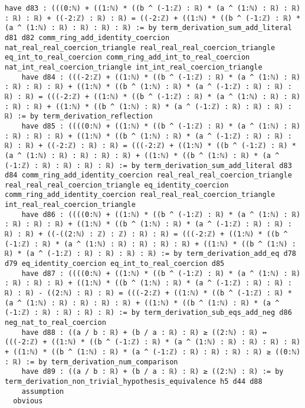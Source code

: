 \documentclass{article}
\begin{document}
\begin{tcolorbox}[colback=white!10, width=\linewidth]
\begin{lstlisting}[language=Lean4]
    have d83 : (((0:ℕ) + ((1:ℕ) * ((b ^ (-1:ℤ) : ℝ) * (a ^ (1:ℕ) : ℝ) : ℝ) : ℝ) : ℝ) + ((-2:ℤ) : ℝ) : ℝ) = ((-2:ℤ) + ((1:ℕ) * ((b ^ (-1:ℤ) : ℝ) * (a ^ (1:ℕ) : ℝ) : ℝ) : ℝ) : ℝ) := by term_derivation_sum_add_literal d81 d82 comm_ring_add_identity_coercion nat_real_real_coercion_triangle real_real_real_coercion_triangle eq_int_to_real_coercion comm_ring_add_int_to_real_coercion nat_int_real_coercion_triangle int_int_real_coercion_triangle
    have d84 : (((-2:ℤ) + ((1:ℕ) * ((b ^ (-1:ℤ) : ℝ) * (a ^ (1:ℕ) : ℝ) : ℝ) : ℝ) : ℝ) + ((1:ℕ) * ((b ^ (1:ℕ) : ℝ) * (a ^ (-1:ℤ) : ℝ) : ℝ) : ℝ) : ℝ) = (((-2:ℤ) + ((1:ℕ) * ((b ^ (-1:ℤ) : ℝ) * (a ^ (1:ℕ) : ℝ) : ℝ) : ℝ) : ℝ) + ((1:ℕ) * ((b ^ (1:ℕ) : ℝ) * (a ^ (-1:ℤ) : ℝ) : ℝ) : ℝ) : ℝ) := by term_derivation_reflection
    have d85 : ((((0:ℕ) + ((1:ℕ) * ((b ^ (-1:ℤ) : ℝ) * (a ^ (1:ℕ) : ℝ) : ℝ) : ℝ) : ℝ) + ((1:ℕ) * ((b ^ (1:ℕ) : ℝ) * (a ^ (-1:ℤ) : ℝ) : ℝ) : ℝ) : ℝ) + ((-2:ℤ) : ℝ) : ℝ) = (((-2:ℤ) + ((1:ℕ) * ((b ^ (-1:ℤ) : ℝ) * (a ^ (1:ℕ) : ℝ) : ℝ) : ℝ) : ℝ) + ((1:ℕ) * ((b ^ (1:ℕ) : ℝ) * (a ^ (-1:ℤ) : ℝ) : ℝ) : ℝ) : ℝ) := by term_derivation_sum_add_literal d83 d84 comm_ring_add_identity_coercion real_real_real_coercion_triangle real_real_real_coercion_triangle eq_identity_coercion comm_ring_add_identity_coercion real_real_real_coercion_triangle int_real_real_coercion_triangle
    have d86 : ((((0:ℕ) + ((1:ℕ) * ((b ^ (-1:ℤ) : ℝ) * (a ^ (1:ℕ) : ℝ) : ℝ) : ℝ) : ℝ) + ((1:ℕ) * ((b ^ (1:ℕ) : ℝ) * (a ^ (-1:ℤ) : ℝ) : ℝ) : ℝ) : ℝ) + ((-((2:ℕ) : ℤ) : ℤ) : ℝ) : ℝ) = (((-2:ℤ) + ((1:ℕ) * ((b ^ (-1:ℤ) : ℝ) * (a ^ (1:ℕ) : ℝ) : ℝ) : ℝ) : ℝ) + ((1:ℕ) * ((b ^ (1:ℕ) : ℝ) * (a ^ (-1:ℤ) : ℝ) : ℝ) : ℝ) : ℝ) := by term_derivation_add_eq d78 d79 eq_identity_coercion eq_int_to_real_coercion d85
    have d87 : ((((0:ℕ) + ((1:ℕ) * ((b ^ (-1:ℤ) : ℝ) * (a ^ (1:ℕ) : ℝ) : ℝ) : ℝ) : ℝ) + ((1:ℕ) * ((b ^ (1:ℕ) : ℝ) * (a ^ (-1:ℤ) : ℝ) : ℝ) : ℝ) : ℝ) - ((2:ℕ) : ℝ) : ℝ) = (((-2:ℤ) + ((1:ℕ) * ((b ^ (-1:ℤ) : ℝ) * (a ^ (1:ℕ) : ℝ) : ℝ) : ℝ) : ℝ) + ((1:ℕ) * ((b ^ (1:ℕ) : ℝ) * (a ^ (-1:ℤ) : ℝ) : ℝ) : ℝ) : ℝ) := by term_derivation_sub_eqs_add_neg d86 neg_nat_to_real_coercion
    have d88 : ((a / b : ℝ) + (b / a : ℝ) : ℝ) ≥ ((2:ℕ) : ℝ) ↔ (((-2:ℤ) + ((1:ℕ) * ((b ^ (-1:ℤ) : ℝ) * (a ^ (1:ℕ) : ℝ) : ℝ) : ℝ) : ℝ) + ((1:ℕ) * ((b ^ (1:ℕ) : ℝ) * (a ^ (-1:ℤ) : ℝ) : ℝ) : ℝ) : ℝ) ≥ ((0:ℕ) : ℝ) := by term_derivation_num_comparison
    have d89 : ((a / b : ℝ) + (b / a : ℝ) : ℝ) ≥ ((2:ℕ) : ℝ) := by term_derivation_non_trivial_hypothesis_equivalence h5 d44 d88
    assumption
  obvious

\end{lstlisting}
\end{tcolorbox}
\end{document}
